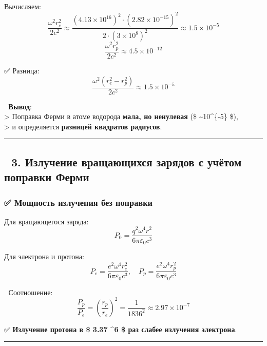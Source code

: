 \documentclass[11pt]{article}
\begin{document}
Вычисляем: \[
\frac{\omega^2 r_e^2}{2c^2} \approx \frac{(4.13 \times 10^{16})^2 \cdot (2.82 \times 10^{-15})^2}{2 \cdot (3 \times 10^8)^2} \approx 1.5 \times 10^{-5}
\] \[
\frac{\omega^2 r_p^2}{2c^2} \approx 4.5 \times 10^{-12}
\]

✅ Разница: \[
\frac{\omega^2 (r_e^2 - r_p^2)}{2c^2} \approx 1.5 \times 10^{-5}
\]

📌 \textbf{Вывод}:\\
\textgreater{} Поправка Ферми в атоме водорода \textbf{мала, но
ненулевая} (\$ \sim 10\^{}\{-5\} \$),\\
\textgreater{} и определяется \textbf{разницей квадратов радиусов}.

\begin{center}\rule{0.5\linewidth}{\linethickness}\end{center}

\subsection{🔹 3. Излучение вращающихся зарядов с учётом поправки
Ферми}\label{ux438ux437ux43bux443ux447ux435ux43dux438ux435-ux432ux440ux430ux449ux430ux44eux449ux438ux445ux441ux44f-ux437ux430ux440ux44fux434ux43eux432-ux441-ux443ux447ux451ux442ux43eux43c-ux43fux43eux43fux440ux430ux432ux43aux438-ux444ux435ux440ux43cux438}

\subsubsection{✅ Мощность излучения без
поправки}\label{ux43cux43eux449ux43dux43eux441ux442ux44c-ux438ux437ux43bux443ux447ux435ux43dux438ux44f-ux431ux435ux437-ux43fux43eux43fux440ux430ux432ux43aux438}

Для вращающегося заряда: \[
P_0 = \frac{q^2 \omega^4 r^2}{6\pi\varepsilon_0 c^3}
\]

Для электрона и протона: \[
P_e = \frac{e^2 \omega^4 r_e^2}{6\pi\varepsilon_0 c^3}, \quad P_p = \frac{e^2 \omega^4 r_p^2}{6\pi\varepsilon_0 c^3}
\]

📌 Соотношение: \[
\frac{P_p}{P_e} = \left( \frac{r_p}{r_e} \right)^2 = \frac{1}{1836^2} \approx 2.97 \times 10^{-7}
\]

✅ \textbf{Излучение протона в \$ 3.37 \^{}6 \$ раз слабее
излучения электрона}.

\begin{center}\rule{0.5\linewidth}{\linethickness}\end{center}
\end{document}
